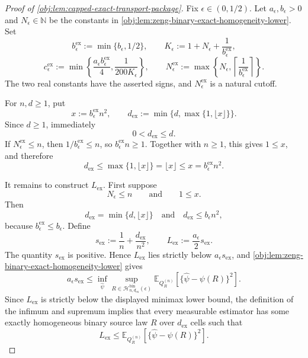 \begin{proof}[Proof of \cref{obj:lem:capped-exact-transport-package}]
Fix \(\epsilon\in(0,1/2)\).  Let \(a_\epsilon,b_\epsilon>0\) and \(N_\epsilon\in\mathbb N\) be the constants in \cref{obj:lem:zeng-binary-exact-homogeneity-lower}.  Set
\[
b_{\epsilon}^{\mathrm{ex}}:=\min\{b_\epsilon,1/2\},
\qquad
K_\epsilon:=1+N_\epsilon+\frac1{b_{\epsilon}^{\mathrm{ex}}},
\]
\[
c_{\epsilon}^{\mathrm{ex}}
:=
\min\left\{\frac{a_\epsilon b_{\epsilon}^{\mathrm{ex}}}{4},
\frac{1}{200K_\epsilon}\right\},
\qquad
N_{\epsilon}^{\mathrm{ex}}
:=
\max\left\{N_\epsilon,\left\lceil\frac1{b_{\epsilon}^{\mathrm{ex}}}\right\rceil\right\}.
\]
The two real constants have the asserted signs, and \(N_{\epsilon}^{\mathrm{ex}}\) is a natural cutoff. %

For \(n,d\ge1\), put
\[
x:=b_{\epsilon}^{\mathrm{ex}}n^2,
\qquad
d_{\mathrm{ex}}
:=
\min\{d,\max\{1,\lfloor x\rfloor\}\}.
\]
Since \(d\ge1\), immediately
\[
0<d_{\mathrm{ex}}\le d .
\]
If \(N_{\epsilon}^{\mathrm{ex}}\le n\), then \(1/b_{\epsilon}^{\mathrm{ex}}\le n\), so \(b_{\epsilon}^{\mathrm{ex}}n\ge1\).  Together with \(n\ge1\), this gives \(1\le x\), and therefore
\[
d_{\mathrm{ex}}
\le
\max\{1,\lfloor x\rfloor\}
=
\lfloor x\rfloor
\le x
=
b_{\epsilon}^{\mathrm{ex}}n^2 .
\]

It remains to construct \(L_{\mathrm{ex}}\).  First suppose
\[
N_\epsilon\le n
\qquad\text{and}\qquad
1\le x .
\]
Then
\[
d_{\mathrm{ex}}=\min\{d,\lfloor x\rfloor\}
\quad\text{and}\quad
d_{\mathrm{ex}}\le b_\epsilon n^2,
\]
because \(b_{\epsilon}^{\mathrm{ex}}\le b_\epsilon\).  Define
\[
s_{\mathrm{ex}}:=\frac1n+\frac{d_{\mathrm{ex}}}{n^2},
\qquad
L_{\mathrm{ex}}:=\frac{a_\epsilon}{2}s_{\mathrm{ex}} .
\]
The quantity \(s_{\mathrm{ex}}\) is positive.  Hence \(L_{\mathrm{ex}}\) lies strictly below
\(a_\epsilon s_{\mathrm{ex}}\), and \cref{obj:lem:zeng-binary-exact-homogeneity-lower} gives
\[
a_\epsilon s_{\mathrm{ex}}
\le
\inf_{\widehat\psi}
\sup_{R\in\mathcal H_{n,d_{\mathrm{ex}}}^{\mathrm{bin}}(\epsilon)}
\mathbb E_{Q_R^{(n)}}\!\left[
\{\widehat\psi-\psi(R)\}^2
\right].
\]
Since \(L_{\mathrm{ex}}\) is strictly below the displayed minimax lower bound, the definition of the infimum and supremum implies that every measurable estimator has some exactly homogeneous binary source law \(R\) over \(d_{\mathrm{ex}}\) cells such that
\[
L_{\mathrm{ex}}
\le
\mathbb E_{Q_R^{(n)}}\!\left[
\{\widehat\psi-\psi(R)\}^2
\right].
\]


\end{proof}

